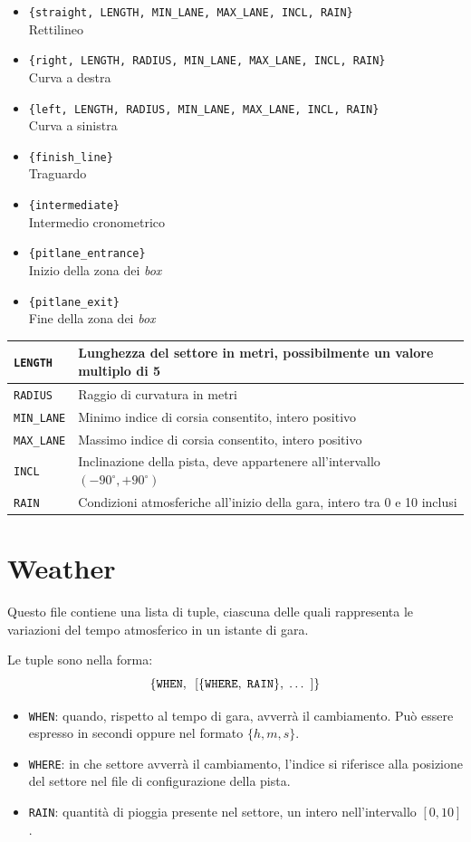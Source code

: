 \documentclass[a4paper]{report}
\begin{document}
\begin{itemize}
\item \verb!{straight, LENGTH, MIN_LANE, MAX_LANE, INCL, RAIN}!\\ Rettilineo
\item \verb!{right, LENGTH, RADIUS, MIN_LANE, MAX_LANE, INCL, RAIN}!\\ Curva a destra
\item \verb!{left, LENGTH, RADIUS, MIN_LANE, MAX_LANE, INCL, RAIN}!\\ Curva a sinistra
\item \verb!{finish_line}!\\ Traguardo
\item \verb!{intermediate}!\\ Intermedio cronometrico
\item \verb!{pitlane_entrance}!\\ Inizio della zona dei \textit{box}
\item \verb!{pitlane_exit}!\\ Fine della zona dei \textit{box}
\end{itemize}

\begin{tabularx}{\textwidth}{|l|X|}
\hline
\texttt{LENGTH} & Lunghezza del settore in metri, possibilmente un valore multiplo di 5\\
\hline
\texttt{RADIUS} & Raggio di curvatura in metri\\
\hline
\texttt{MIN\_LANE} & Minimo indice di corsia consentito, intero positivo\\
\hline
\texttt{MAX\_LANE} & Massimo indice di corsia consentito, intero positivo\\
\hline
\texttt{INCL} & Inclinazione della pista, deve appartenere all'intervallo $(-90^\circ, +90^\circ)$\\
\hline
\texttt{RAIN} & Condizioni atmosferiche all'inizio della gara, intero tra 0 e 10 inclusi\\
\hline
\end{tabularx}

\section*{Weather}
Questo file contiene una lista di tuple, ciascuna delle quali rappresenta le variazioni del tempo atmosferico in un istante di gara.

Le tuple sono nella forma:
\[ \{\mbox{\texttt{WHEN}},\;\: [\{\mbox{\texttt{WHERE}},\; \mbox{\texttt{RAIN}}\},\; \ldots\;\: ]\} \]
\begin{itemize}
\item \texttt{WHEN}: quando, rispetto al tempo di gara, avverrà il cambiamento. Può essere espresso in secondi oppure nel formato $\{h,m,s\}$.
\item \texttt{WHERE}: in che settore avverrà il cambiamento, l'indice si riferisce alla posizione del settore nel file di configurazione della pista.
\item \texttt{RAIN}: quantità di pioggia presente nel settore, un intero nell'intervallo $[0, 10]$.
\end{itemize}
\end{document}
